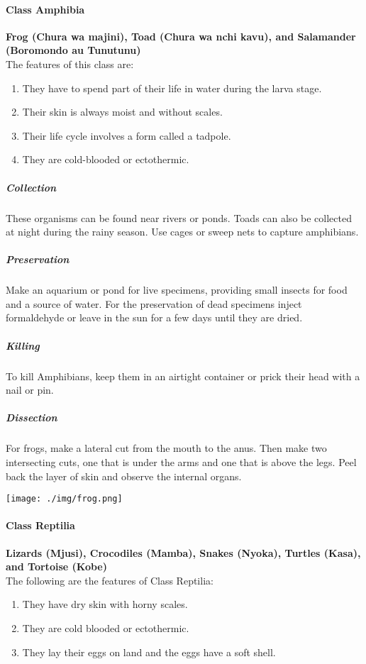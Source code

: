 \begin{multicols}{2}
\paragraph{Class Amphibia}
\textbf{Frog (Chura wa majini), Toad (Chura wa nchi kavu), and Salamander (Boromondo au Tunutunu)}\\The features of this class are:
\begin{enumerate}
\item{They have to spend part of their life in water during the larva stage.}
\item{Their skin is always moist and without scales.}
\item{Their life cycle involves a form called a tadpole.}
\item{They are cold-blooded or ectothermic.}
\end{enumerate}

\subparagraph{Collection}
These organisms can be found near rivers or ponds. Toads can also be collected at night during the rainy season. Use cages or sweep nets to capture amphibians.

\subparagraph{Preservation} 
Make an aquarium or pond for live specimens, providing small insects for food and a source of water. For the preservation of dead specimens inject formaldehyde or leave in the sun for a few days until they are dried.

\subparagraph{Killing}
To kill Amphibians, keep them in an airtight container or prick their head with a nail or pin.

\subparagraph{Dissection}
For frogs, make a lateral cut from the mouth to the anus. Then make two intersecting cuts, one that is under the arms and one that is above the legs. Peel back the layer of skin and observe the internal organs.

\begin{center}
\texttt{[image: ./img/frog.png]}
\end{center}

%

\paragraph{Class Reptilia}
\textbf{Lizards (Mjusi), Crocodiles (Mamba), Snakes (Nyoka), Turtles (Kasa), and Tortoise (Kobe)}\\The following are the features of Class Reptilia:
\begin{enumerate}
\item{They have dry skin with horny scales.}
\item{They are cold blooded or ectothermic.}
\item{They lay their eggs on land and the eggs have a soft shell.}
\end{enumerate}


\end{multicols}
